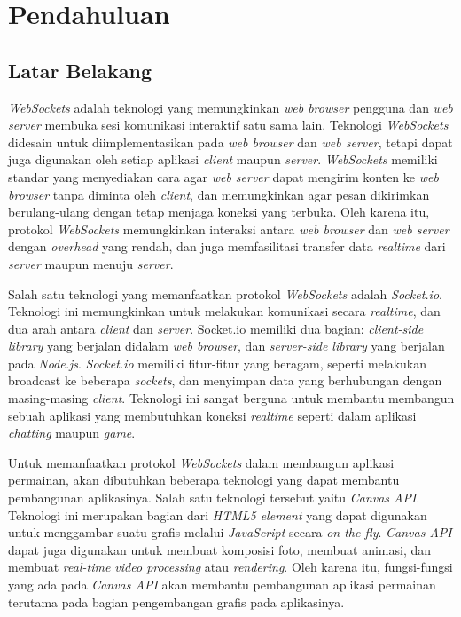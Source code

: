 \chapter{Pendahuluan}
\label{chap:intro}
   
\section{Latar Belakang}
\label{sec:label}

\textit{WebSockets} adalah teknologi yang memungkinkan \textit{web browser} pengguna dan \textit{web server} membuka sesi komunikasi interaktif satu sama lain. Teknologi \textit{WebSockets}  didesain untuk diimplementasikan pada \textit{web browser} dan \textit{web server}, tetapi dapat juga digunakan oleh setiap aplikasi \textit{client} maupun \textit{server}. \textit{WebSockets} memiliki standar yang menyediakan cara agar \textit{web server} dapat mengirim konten ke \textit{web browser} tanpa diminta oleh \textit{client}, dan memungkinkan agar pesan dikirimkan berulang-ulang dengan tetap menjaga koneksi yang terbuka. Oleh karena itu, protokol \textit{WebSockets} memungkinkan interaksi antara \textit{web browser} dan \textit{web server} dengan \textit{overhead} yang rendah, dan juga memfasilitasi transfer data \textit{realtime} dari \textit{server} maupun menuju \textit{server}.

Salah satu teknologi yang memanfaatkan protokol \textit{WebSockets} adalah \textit{Socket.io}. Teknologi ini memungkinkan untuk melakukan komunikasi secara \textit{realtime}, dan dua arah antara \textit{client} dan \textit{server}. Socket.io memiliki dua bagian: \textit{client-side library} yang berjalan didalam \textit{web browser}, dan \textit{server-side library} yang berjalan pada \textit{Node.js}. \textit{Socket.io} memiliki fitur-fitur yang beragam, seperti melakukan broadcast ke beberapa \textit{sockets}, dan menyimpan data yang berhubungan dengan masing-masing \textit{client}. Teknologi ini sangat berguna untuk membantu membangun sebuah aplikasi yang membutuhkan koneksi \textit{realtime} seperti dalam aplikasi \textit{chatting} maupun \textit{game}.

Untuk memanfaatkan protokol \textit{WebSockets} dalam membangun aplikasi permainan, akan dibutuhkan beberapa teknologi yang dapat membantu pembangunan aplikasinya. Salah satu teknologi tersebut yaitu \textit{Canvas API}. Teknologi ini merupakan bagian dari \textit{HTML5 element} yang dapat digunakan untuk menggambar suatu grafis melalui \textit{JavaScript} secara \textit{on the fly}. \textit{Canvas API} dapat juga digunakan untuk membuat komposisi foto, membuat animasi, dan membuat \textit{real-time video processing} atau \textit{rendering}. Oleh karena itu, fungsi-fungsi yang ada pada \textit{Canvas API} akan membantu pembangunan aplikasi permainan terutama pada bagian pengembangan grafis pada aplikasinya.

